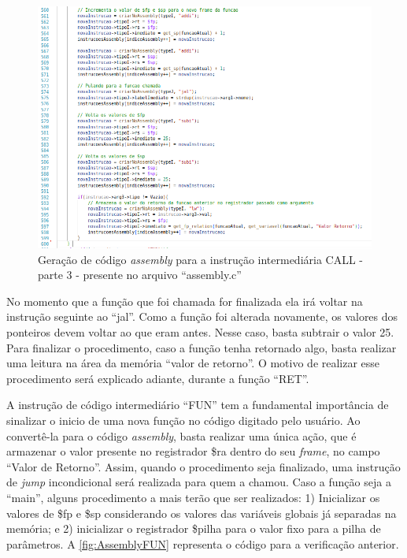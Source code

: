 \documentclass[
	12pt,				%
	oneside,
	a4paper,			%
	english,			%
	french,				%
	spanish,			%
	brazil,				%
	]{abntex2}
\begin{document}
\begin{figure}[H]
\centering 
\caption{Geração de código \emph{assembly} para a instrução intermediária CALL - parte 3 - presente no arquivo ``assembly.c''} \label{fig:AssemblyCALL3}
\graphicspath{ {./imgs/} } 
\includegraphics[scale=0.4]{imgs/Codigo/Cod_Assembly_Call3.png}
\end{figure}


No momento que a função que foi chamada for finalizada ela irá voltar na instrução seguinte ao ``jal''. Como a função foi alterada novamente, os valores dos ponteiros devem voltar ao que eram antes. Nesse caso, basta subtrair o valor 25. Para finalizar o procedimento, caso a função tenha retornado algo, basta realizar uma leitura na área da memória ``valor de retorno''. O motivo de realizar esse procedimento será explicado adiante, durante a função ``RET''.

A instrução de código intermediário ``FUN'' tem a fundamental importância de sinalizar o inicio de uma nova função no código digitado pelo usuário. Ao convertê-la para o código \emph{assembly}, basta realizar uma única ação, que é armazenar o valor presente no registrador \$ra dentro do seu \emph{frame}, no campo ``Valor de Retorno''. Assim, quando o procedimento seja finalizado, uma instrução de \emph{jump} incondicional será realizada para quem a chamou. Caso a função seja a ``main'', alguns procedimento a mais terão que ser realizados: 1) Inicializar os valores de \$fp e \$sp considerando os valores das variáveis globais já separadas na memória; e 2) inicializar o registrador \$pilha para o valor fixo para a pilha de parâmetros. A \autoref{fig:AssemblyFUN} representa o código para a verificação anterior.
\end{document}
